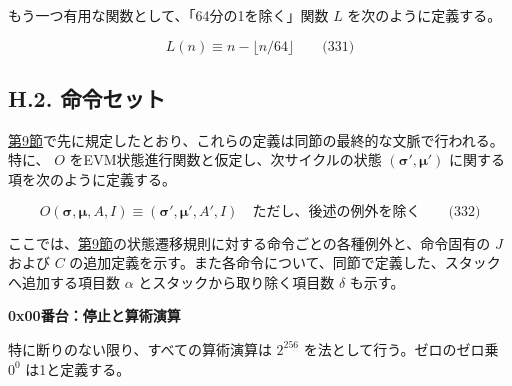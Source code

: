 \documentclass[
]{ltjsarticle}
\begin{document}
もう一つ有用な関数として、「64分の1を除く」関数 \(L\)
を次のように定義する。

\protect\hypertarget{eq-331}{}{}

\[L(n) \equiv n - \lfloor n / 64 \rfloor \qquad \text{(331)}\]

\protect\hypertarget{subsec:instruction-set}{}{}

\hypertarget{h.2.-ux547dux4ee4ux30bbux30c3ux30c8}{%
\subsection{H.2. 命令セット}\label{h.2.-ux547dux4ee4ux30bbux30c3ux30c8}}

\protect\hyperlink{ch:model}{第9節}で先に規定したとおり、これらの定義は同節の最終的な文脈で行われる。特に、
\(O\) をEVM状態進行関数と仮定し、次サイクルの状態
\((\boldsymbol{\sigma}', \boldsymbol{\mu}')\)
に関する項を次のように定義する。

\protect\hypertarget{eq-332}{}{}

\[O(\boldsymbol{\sigma}, \boldsymbol{\mu}, A, I) \equiv (\boldsymbol{\sigma}', \boldsymbol{\mu}', A', I) \quad \text{ただし、後述の例外を除く} \qquad \text{(332)}\]

ここでは、\protect\hyperlink{ch:model}{第9節}の状態遷移規則に対する命令ごとの各種例外と、命令固有の
\(J\) および \(C\)
の追加定義を示す。また各命令について、同節で定義した、スタックへ追加する項目数
\(\alpha\) とスタックから取り除く項目数 \(\delta\) も示す。

\textbf{0x00番台：停止と算術演算}

特に断りのない限り、すべての算術演算は \(2^{256}\)
を法として行う。ゼロのゼロ乗 \(0^0\) は1と定義する。
\end{document}

